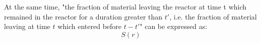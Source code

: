 At the same time, "the fraction of material leaving the reactor at time t which remained in the reactor for a duration greater than $t'$, i.e. the fraction of material leaving at time $t$ which entered before $t-t'$"  can be expressed as:
\begin{equation}
S(r)
\end{equation}